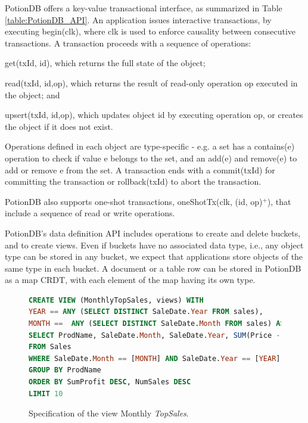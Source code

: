 \documentclass[sigplan,twocolumn,review,anonymous]{acmart}
\newcommand{\code}[1]{\textsf{\small{#1}}}
\begin{document}
PotionDB offers a key-value  transactional interface, as summarized in Table \ref{table:PotionDB_API}.
An application issues interactive transactions, by executing \code{begin(clk)},
where \code{clk} is used to enforce causality between consecutive transactions.
A transaction proceeds with a sequence of operations: 
\begin{inparaenum}[(i)] 
\item \code{get(txId, id)}, which returns the full state of the object;
\item \code{read(txId, id,op)}, which returns the result of read-only operation \code{op} executed in the object; and
\item \code{upsert(txId, id,op)}, which updates object \code{id} by executing operation \code{op}, or creates the object if it does not exist.
\end{inparaenum}
Operations defined in each object are type-specific - e.g. a set has a \code{contains(e)} operation to check
if value \code{e} belongs to the set, and an \code{add(e)} and \code{remove(e)} to add or remove \code{e} from the set.
A transaction ends with a \code{commit(txId)} for committing the transaction %
or \code{rollback(txId)} to abort the transaction.

PotionDB also supports one-shot transactions, \code{oneShotTx(clk, (id, op)$^+$)}, that include a sequence of read or
write operations.

PotionDB's data definition API includes operations to create and delete buckets, and 
to create views. Even if buckets have no associated
data type, i.e., any object type can be stored in any bucket, we expect that applications 
store objects of the same type in each bucket.  A document or a table row can be stored in 
PotionDB as a map CRDT, with each element of the map having its own type. 


\begin{figure}[t]
\small{
\begin{lstlisting}[language=SQL]
CREATE VIEW (MonthlyTopSales, views) WITH 
YEAR == ANY (SELECT DISTINCT SaleDate.Year FROM sales), 
MONTH ==  ANY (SELECT DISTINCT SaleDate.Month FROM sales) AS
SELECT ProdName, SaleDate.Month, SaleDate.Year, SUM(Price - Cost) AS SumProfit, COUNT(*) AS NumSales
FROM Sales
WHERE SaleDate.Month == [MONTH] AND SaleDate.Year == [YEAR]
GROUP BY ProdName
ORDER BY SumProfit DESC, NumSales DESC
LIMIT 10
\end{lstlisting}}
	\vspace{-5pt}
	\caption{Specification of the view Monthly \emph{TopSales}.}
	\vspace{-10pt}
	\label{fig:viewtopsales}
\end{figure}
\end{document}
